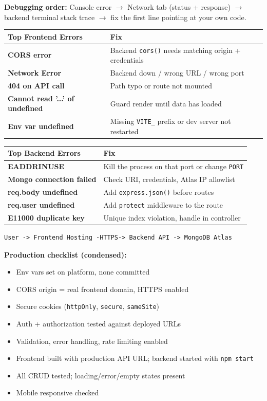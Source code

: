 \textbf{Debugging order:} Console error $\to$ Network tab (status +
response) $\to$ backend terminal stack trace $\to$ fix the first line
pointing at your own code.

\begin{tabularx}{\textwidth}{@{}>{\bfseries}p{3cm}X@{}}
\toprule
Top Frontend Errors & Fix \\
\midrule
CORS error & Backend \texttt{cors()} needs matching origin + credentials \\
Network Error & Backend down / wrong URL / wrong port \\
404 on API call & Path typo or route not mounted \\
Cannot read '...' of undefined & Guard render until data has loaded \\
Env var undefined & Missing \texttt{VITE\_} prefix or dev server not
restarted \\
\bottomrule
\end{tabularx}

\begin{tabularx}{\textwidth}{@{}>{\bfseries}p{3cm}X@{}}
\toprule
Top Backend Errors & Fix \\
\midrule
EADDRINUSE & Kill the process on that port or change \texttt{PORT} \\
Mongo connection failed & Check URI, credentials, Atlas IP allowlist \\
req.body undefined & Add \texttt{express.json()} before routes \\
req.user undefined & Add \texttt{protect} middleware to the route \\
E11000 duplicate key & Unique index violation, handle in controller \\
\bottomrule
\end{tabularx}

\begin{diagrambox}
\begin{verbatim}
User -> Frontend Hosting -HTTPS-> Backend API -> MongoDB Atlas
\end{verbatim}
\end{diagrambox}

\textbf{Production checklist (condensed):}
\begin{itemize}
\item[$\square$] Env vars set on platform, none committed
\item[$\square$] CORS origin = real frontend domain, HTTPS enabled
\item[$\square$] Secure cookies (\texttt{httpOnly}, \texttt{secure},
\texttt{sameSite})
\item[$\square$] Auth + authorization tested against deployed URLs
\item[$\square$] Validation, error handling, rate limiting enabled
\item[$\square$] Frontend built with production API URL; backend started
with \texttt{npm start}
\item[$\square$] All CRUD tested; loading/error/empty states present
\item[$\square$] Mobile responsive checked
\end{itemize}
